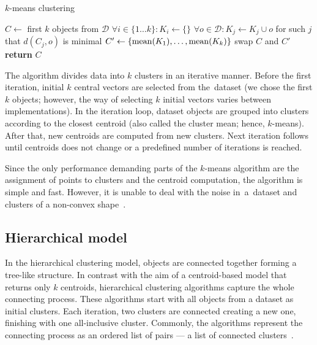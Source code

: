 \begin{algorithm}[t]
	\caption{$k$-means clustering}
	\label{alg01:kmeans}
	\begin{algorithmic}[1]
		\State $C \gets$ first $k$ objects from  $\mathcal{D}$ 
		\Repeat
			\State $\forall i \in \{1\dots k\}:K_i \gets \{\}$  
			\State $\forall o \in \mathcal{D}:K_{j} \gets K_{j} \cup o$ for such $j$ that $d(C_j,o)$ is minimal 
			\State $C' \gets \{\operatorname{mean}(K_1),\dots,\operatorname{mean}(K_k)\}$
			\State swap $C$ and $C'$
		\State \textbf{return} $C$
		\EndProcedure
	\end{algorithmic}
\end{algorithm}


The algorithm divides data into $k$ clusters in an iterative manner. Before the first iteration, initial $k$ central vectors are selected from the~dataset (we chose the first $k$ objects; however, the way of selecting $k$ initial vectors varies between 
implementations). In the iteration loop, dataset objects are grouped into clusters according to the closest centroid (also called the cluster mean; hence, $k$-means). After that, new centroids are computed from new clusters. Next iteration follows until centroids does not change or a predefined number of iterations is reached. 

Since the only performance demanding parts of the $k$-means algorithm are the assignment of points to clusters and the centroid computation, the algorithm is simple and fast. However, it is unable to deal with the noise in~a~dataset and clusters of a non-convex shape~\cite{uppada2014centroid}.
  

\subsection{Hierarchical model}

In the hierarchical clustering model, objects are connected together forming a tree-like structure. In contrast with the aim of a centroid-based model that returns only $k$ centroids, hierarchical clustering algorithms capture the whole connecting process. These algorithms start with all objects from a dataset as initial clusters. Each iteration, two clusters are connected creating a new one, finishing with one all-inclusive cluster. Commonly, the algorithms represent the connecting process as an ordered list of pairs --- a list of connected clusters~\cite{karypis1999chameleon}.

